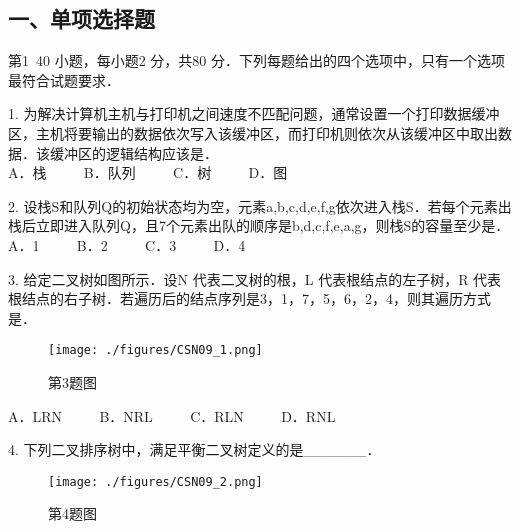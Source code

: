 
\subsection{一、单项选择题}
第1~40 小题，每小题2 分，共80 分．下列每题给出的四个选项中，只有一个选项最符合试题要求．

1. 为解决计算机主机与打印机之间速度不匹配问题，通常设置一个打印数据缓冲区，主机将要输出的数据依次写入该缓冲区，而打印机则依次从该缓冲区中取出数据．该缓冲区的逻辑结构应该是． \\
A．栈 $\qquad$ B．队列 $\qquad$ C．树 $\qquad$ D．图

2. 设栈S和队列Q的初始状态均为空，元素a,b,c,d,e,f,g依次进入栈S．若每个元素出栈后立即进入队列Q，且7个元素出队的顺序是b,d,c,f,e,a,g，则栈S的容量至少是． \\
A．1 $\qquad$ B．2 $\qquad$ C．3 $\qquad$ D．4

3. 给定二叉树如图所示．设N 代表二叉树的根，L 代表根结点的左子树，R 代表根结点的右子树．若遍历后的结点序列是3，1，7，5，6，2，4，则其遍历方式是． \\
\begin{figure}[ht]
\centering
\texttt{[image: ./figures/CSN09\_1.png]}
\caption{第3题图} \label{CSN09_fig1}
\end{figure}
A．LRN $\qquad$ B．NRL $\qquad$ C．RLN $\qquad$ D．RNL

4. 下列二叉排序树中，满足平衡二叉树定义的是______．\\
\begin{figure}[ht]
\centering
\texttt{[image: ./figures/CSN09\_2.png]}
\caption{第4题图} \label{CSN09_fig2}
\end{figure}